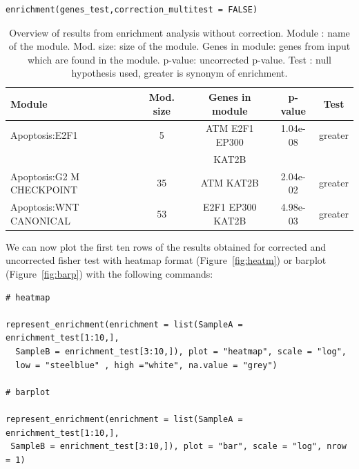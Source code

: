 \documentclass[article]{jss}
\begin{document}
\begin{verbatim}
enrichment(genes_test,correction_multitest = FALSE)
\end{verbatim}


\begin{table}[h!]
  \centering
  \caption{Overview of results from enrichment analysis without correction.
  Module : name of the module. Mod. size: size of the module. Genes in module:
  genes from input which are found in the module. p-value: uncorrected p-value.
  Test : null hypothesis used, greater is synonym of enrichment.}
  \label{tab:table2}

  \begin{tabular}{l|c|c|c|c}
	\hline
Module & Mod. size & Genes in module & p-value & Test\\
	\hline
Apoptosis:E2F1 & 5 &  ATM E2F1 EP300 & 1.04e-08 & greater \\
               &   &  KAT2B                 &          &         \\
Apoptosis:G2 M CHECKPOINT & 35  & ATM KAT2B & 2.04e-02 & greater \\
Apoptosis:WNT CANONICAL & 53 & E2F1 EP300 KAT2B  & 4.98e-03 & greater \\
	\hline

	\end{tabular}
\end{table}

We can now plot the first ten rows of the results obtained for corrected and
uncorrected fisher test with heatmap format (Figure~\ref{fig:heatm}) or barplot
(Figure~\ref{fig:barp}) with the following commands:

\begin{verbatim}
# heatmap

represent_enrichment(enrichment = list(SampleA = enrichment_test[1:10,], 
  SampleB = enrichment_test[3:10,]), plot = "heatmap", scale = "log", 
  low = "steelblue" , high ="white", na.value = "grey")

# barplot 

represent_enrichment(enrichment = list(SampleA = enrichment_test[1:10,],
 SampleB = enrichment_test[3:10,]), plot = "bar", scale = "log", nrow = 1)
\end{verbatim}
\end{document}
